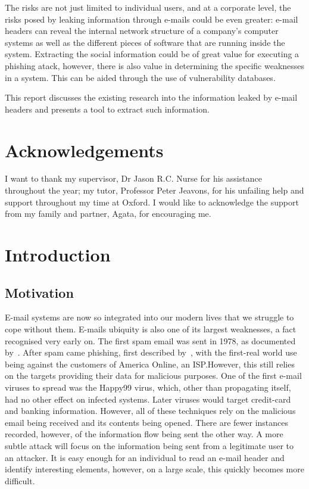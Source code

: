 \documentclass[twoside,10pt]{scrreprt}
\begin{document}
    The risks are not just limited to individual users, and at a corporate
    level, the risks posed by leaking information through e-mails could be even
    greater: e-mail headers can reveal the internal network structure of a
    company's computer systems as well as the different pieces of software that
    are running inside the system.  Extracting the social information could be
    of great value for executing a phishing atack, however, there is also value
    in determining the specific weaknesses in a system.  This can be aided
    through the use of vulnerability databases.

    This report discusses the existing research into the information leaked by
    e-mail headers and presents a tool to extract such information.

    \chapter*{Acknowledgements}

    I want to thank my supervisor, Dr Jason R.C. Nurse for his assistance
    throughout the year; my tutor, Professor Peter Jeavons, for his unfailing
    help and support throughout my time at Oxford.  I would like to acknowledge
    the support from my family and partner, Agata, for encouraging me.

    \tableofcontents \listoftables \listoffigures \listofalgorithms

    \chapter{Introduction}

    \section{Motivation}

    E-mail systems are now so integrated into our modern lives that we struggle to
    cope without them.  E-mails ubiquity is also one of its largest weaknesses, a
    fact recognised very early on.  The first spam email was sent in 1978, as
    documented by~\cite{templeton}.  After spam came phishing, first described
    by~\cite{felix1987system}, with the first-real world use being against the
    customers of America Online, an ISP.\@  However, this still relies on the
    targets providing their data for malicious purposes. One of the first e-mail
    viruses to spread was the Happy99 virus, which, other than propagating itself,
    had no other effect on infected systems. Later viruses would target credit-card
    and banking information. However, all of these techniques rely on the malicious
    email being received and its contents being opened.  There are fewer instances
    recorded, however, of the information flow being sent the other way.  A more
    subtle attack will focus on the information being sent from a legitimate user to
    an attacker. It is easy enough for an individual to read an e-mail header and
    identify interesting elements, however, on a large scale, this quickly becomes
    more difficult.
\end{document}
